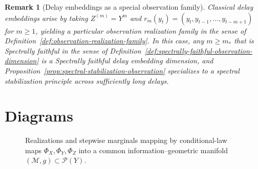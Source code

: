 \documentclass[11pt]{article}
\newtheorem{remark}{Remark}
\newcommand{\Pcal}{\mathcal{P}}
\newcommand{\Mcal}{\mathcal{M}}
\begin{document}
\begin{remark}[Delay embeddings as a special observation family]
\label{rem:delay-embeddings-special-case}
Classical delay embeddings arise by taking $Z^{(m)} = Y^m$ and
$r_m(y_t) = (y_t,y_{t-1},\dots,y_{t-m+1})$ for $m\ge 1$, yielding a
particular observation realization family in the sense of
Definition~\ref{def:observation-realization-family}. In this case, any
$m\ge m_\ast$ that is Spectrally faithful in the sense of
Definition~\ref{def:spectrally-faithful-observation-dimension}
is a Spectrally faithful delay embedding dimension, and
Proposition~\ref{prop:spectral-stabilization-observation} specializes to
a spectral stabilization principle across sufficiently long delays.
\end{remark}




\section*{Diagrams}

\begin{figure}[H]
  \centering
  \caption{Realizations and stepwise marginals mapping by conditional-law
    maps $\Phi_X,\Phi_Y,\Phi_Z$ into a common information--geometric manifold
    $(\Mcal,g) \subset \Pcal(Y)$.}
\end{figure}

 




\end{document}
